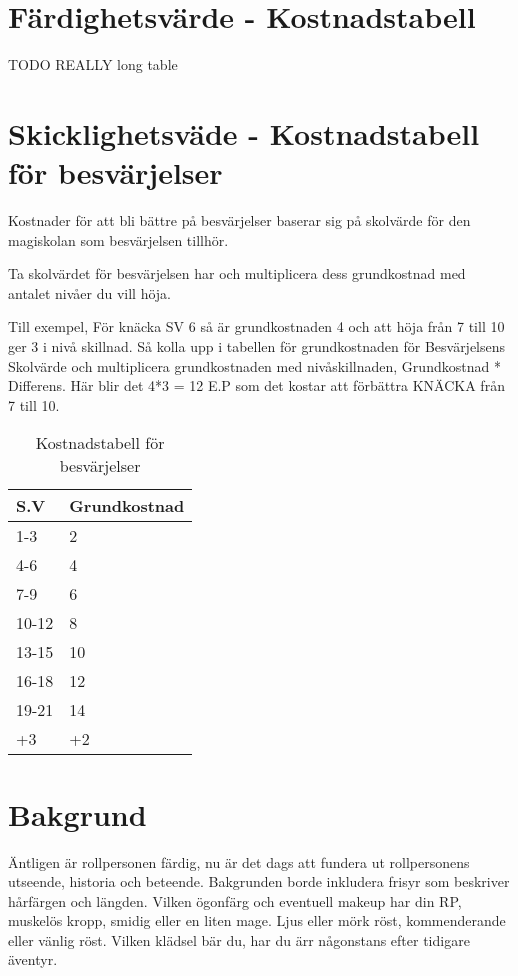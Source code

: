 \documentclass[a4paper, 10pt, titlepage]{article}
\begin{document}
\section{Färdighetsvärde - Kostnadstabell}
TODO REALLY long table

\section{Skicklighetsväde - Kostnadstabell för besvärjelser}
Kostnader för att bli bättre på besvärjelser baserar sig på skolvärde för den magiskolan
som besvärjelsen tillhör.

Ta skolvärdet för besvärjelsen har och multiplicera dess grundkostnad med antalet nivåer
du vill höja.

Till exempel, För knäcka SV 6 så är grundkostnaden 4 och att höja från 7 till 10 ger 3 i nivå skillnad.
Så kolla upp i tabellen för grundkostnaden för Besvärjelsens Skolvärde och multiplicera
grundkostnaden med nivåskillnaden, Grundkostnad * Differens. Här blir det 4*3 = 12 E.P som det kostar
att förbättra KNÄCKA från 7 till 10.

\begin{table}[hbp]
  \caption{Kostnadstabell för besvärjelser}
  \begin{tabular}{|l|l|}
    \hline
    S.V  &   Grundkostnad \\
    \hline
    1-3   & 2 \\
    \hline
    4-6   & 4 \\
    \hline
    7-9   & 6 \\
    \hline
    10-12 & 8 \\
    \hline
    13-15 & 10 \\
    \hline
    16-18 & 12 \\
    \hline
    19-21 & 14 \\
    \hline
    +3    & +2 \\
    \hline
  \end{tabular}
\end{table}

\section{Bakgrund}
Äntligen är rollpersonen färdig, nu är det dags att fundera ut rollpersonens
utseende, historia och beteende. Bakgrunden borde inkludera frisyr som beskriver
hårfärgen och längden. Vilken ögonfärg och eventuell makeup har din RP, muskelös
kropp, smidig eller en liten mage. Ljus eller mörk röst, kommenderande eller vänlig röst.
Vilken klädsel bär du, har du ärr någonstans efter tidigare äventyr.
\end{document}
